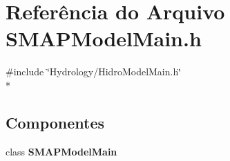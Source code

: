 \section{Referência do Arquivo S\+M\+A\+P\+Model\+Main.\+h}
\label{_s_m_a_p_model_main_8h}
{\ttfamily \#include \char`\"{}Hydrology/\+Hidro\+Model\+Main.\+h\char`\"{}}\\*
\subsection*{Componentes}
\begin{DoxyCompactItemize}
\item 
class {\bf S\+M\+A\+P\+Model\+Main}
\end{DoxyCompactItemize}
